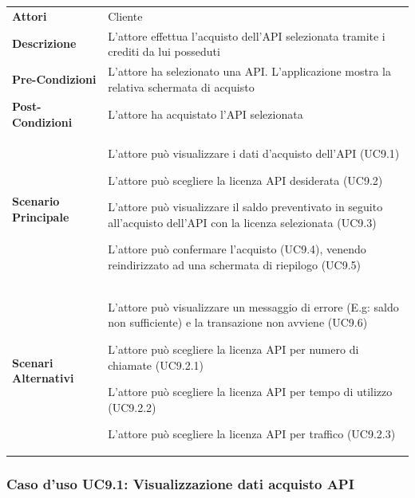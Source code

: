 \begin{longtable}{ l | p{11cm}}
	\hline
	\rowcolor{Gray}
	\multicolumn{2}{c}{UC9 - Acquisto API}\\
	\hline
	\textbf{Attori} & Cliente \\
	\textbf{Descrizione} & L'attore effettua l'acquisto dell'API selezionata tramite i crediti da lui posseduti \\
	\textbf{Pre-Condizioni} & L'attore ha selezionato una API. L'applicazione mostra la relativa schermata di acquisto \\
	\textbf{Post-Condizioni} & L'attore ha acquistato l'API selezionata \\
	\textbf{Scenario Principale} & 
	\begin{enumerate*}[label=(\arabic*.),itemjoin={\newline}]
		\item L'attore può visualizzare i dati d'acquisto dell'API (UC9.1)
		\item L'attore può scegliere la licenza API desiderata (UC9.2)
		\item L'attore può visualizzare il saldo preventivato in seguito all'acquisto dell'API con la licenza selezionata (UC9.3)
		\item L'attore può confermare l'acquisto (UC9.4), venendo reindirizzato ad una schermata di riepilogo (UC9.5)
	\end{enumerate*}\\
	\textbf{Scenari Alternativi} & 
	\begin{enumerate*}[label=(\arabic*.),itemjoin={\newline}]
		\item L'attore può visualizzare un messaggio di errore (E.g: saldo non sufficiente) e la transazione non avviene (UC9.6)
		\item L'attore può scegliere la licenza API per numero di chiamate (UC9.2.1)
		\item L'attore può scegliere la licenza API per tempo di utilizzo (UC9.2.2)
		\item L'attore può scegliere la licenza API per traffico (UC9.2.3)
	\end{enumerate*}\\
\end{longtable}

\subsubsection{Caso d'uso UC9.1: Visualizzazione dati acquisto API}
\label{UC9_1}

